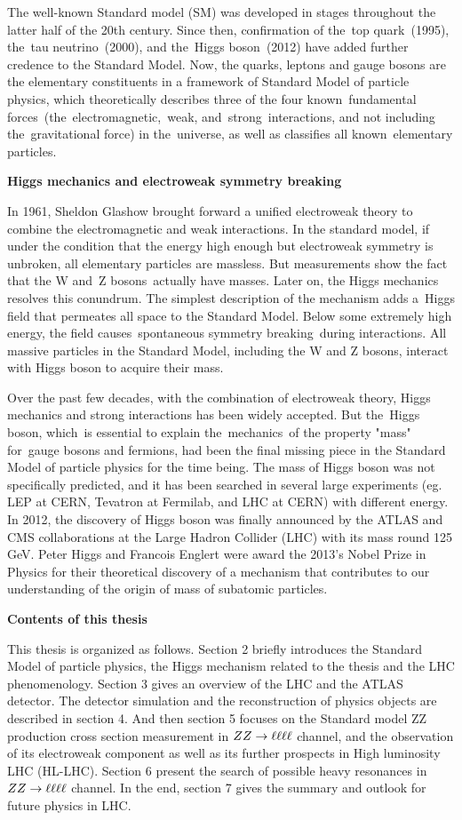 The well-known Standard model (SM) was developed in stages throughout the latter half of the 20th century. 
Since then, confirmation of the top quark (1995), the tau neutrino (2000), and the Higgs boson (2012) have added further credence to the Standard Model.
Now, the quarks, leptons and gauge bosons are the elementary constituents in a framework of Standard Model of particle physics, 
which theoretically describes three of the four known fundamental forces (the electromagnetic, weak, and strong interactions, and not including the gravitational force) in the universe, 
as well as classifies all known elementary particles.

\textbf{Higgs mechanics and electroweak symmetry breaking}

In 1961, Sheldon Glashow brought forward a unified electroweak theory to combine the electromagnetic and weak interactions. 
In the standard model, if under the condition that the energy high enough but electroweak symmetry is unbroken, all elementary particles are massless. 
But measurements show the fact that the W and Z bosons actually have masses. 
Later on, the Higgs mechanics resolves this conundrum. 
The simplest description of the mechanism adds a Higgs field that permeates all space to the Standard Model. 
Below some extremely high energy, the field causes spontaneous symmetry breaking during interactions. 
All massive particles in the Standard Model, including the W and Z bosons, interact with Higgs boson to acquire their mass.

Over the past few decades, with the combination of electroweak theory, Higgs mechanics and strong interactions has been widely accepted. 
But the Higgs boson, which is essential to explain the mechanics of the property "mass" for gauge bosons and fermions, had been the final missing piece in the Standard Model of particle physics for the time being. 
The mass of Higgs boson was not specifically predicted, and it has been searched in several large experiments (eg. LEP at CERN, Tevatron at Fermilab, and LHC at CERN) with different energy. 
In 2012, the discovery of Higgs boson was finally announced by the ATLAS and CMS collaborations at the Large Hadron Collider (LHC) with its mass round 125 GeV. 
Peter Higgs and Francois Englert were award the 2013's Nobel Prize in Physics for their theoretical discovery of a mechanism that contributes to our understanding of the origin of mass of subatomic particles.

\textbf{Contents of this thesis}

This thesis is organized as follows. 
Section 2 briefly introduces the Standard Model of particle physics, the Higgs mechanism related to the thesis and the LHC phenomenology. 
Section 3 gives an overview of the LHC and the ATLAS detector. 
The detector simulation and the reconstruction of physics objects are described in section 4. 
And then section 5 focuses on the Standard model ZZ production cross section measurement in $ZZ \rightarrow \ell\ell\ell\ell$ channel, 
and the observation of its electroweak component as well as its further prospects in High luminosity LHC (HL-LHC). 
Section 6 present the search of possible heavy resonances in $ZZ \rightarrow \ell\ell\ell\ell$ channel. 
In the end, section 7 gives the summary and outlook for future physics in LHC.


